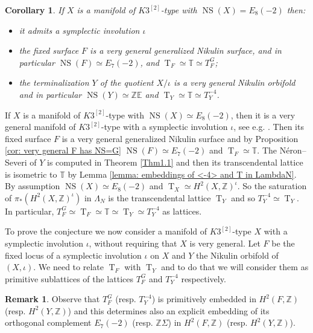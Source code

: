 \documentclass{amsart}
\newtheorem{corr}[thm]{Corollary}
\theoremstyle{definition}
\newtheorem{remark}[thm]{Remark}
\numberwithin{equation}{section}
\numberwithin{equation}{section} \theoremstyle{definition}
\DeclareMathOperator{\NS}{NS}
\DeclareMathOperator{\T}{T}
\newcommand\Z{\mathbb{Z}}
\begin{document}
\begin{corr}\label{5.4}\label{cor: very general F are G polarized and TF=TY}
If $X$ is a manifold of $K3^{[2]}$-type with $\NS(X)=E_8(-2)$ then:\begin{itemize}\item it admits a symplectic involution $\iota$ \item the fixed surface $F$ is a very general generalized Nikulin surface, and in particular $\NS(F)\simeq E_7(-2)$, and $\T_F\simeq \mathbb{T}\simeq T^G_F$; \item  the terminalization $Y$ of the quotient $X/\iota$ is a very general Nikulin orbifold and in particular $\NS(Y)\simeq \Z \mathbb{E}$ and $\T_Y\simeq \mathbb{T}\simeq T_Y^{-4}$.\end{itemize}
\end{corr}
\proof If $X$ is a  manifold of $K3^{[2]}$-type with $\NS(X)\simeq E_8(-2)$, then it is a very general  manifold of $K3^{[2]}$-type with a symplectic involution $\iota$, see e.g. \cite{CGKK}. Then its fixed surface $F$ is a very general generalized Nikulin surface and by Proposition \ref{cor: very general F has NS=G} $\NS(F)\simeq E_7(-2)$ and $\T_F\simeq \mathbb{T}$. The N\'eron--Severi of $Y$ is computed in Theorem \ref{Thm1.1} and then its transcendental lattice is isometric to $\mathbb{T}$ by Lemma \ref{lemma: embeddings of <-4> and T in LambdaN}. By assumption $\NS(X)\simeq E_8(-2)$ and $\T_X\simeq H^2(X,\Z)^{\iota}$. So the saturation of $\pi_*(H^2(X,\Z)^{\iota})$ in $\Lambda_N$ is the transcendental lattice $\T_Y$ and so $T_Y^{-4}\simeq \T_Y$.
In particular, $T_F^G\simeq \T_F\simeq \mathbb{T}\simeq \T_Y\simeq T_Y^{-4}$ as lattices. \endproof


To prove the conjecture \cite[Conjecture 3.12]{CGKK} we now consider a   manifold of $K3^{[2]}$-type $X$ with a symplectic involution $\iota$, without requiring that $X$ is very general. Let $F$ be the fixed locus of a symplectic involution $\iota$ on $X$ and $Y$ the Nikulin orbifold of $(X,\iota)$. We need to relate $\T_F$ with $\T_Y$ and to do that we will consider them as primitive sublattices of the lattices $T_F^G$ and $T_Y^{-4}$ respectively.



\begin{remark} Observe that $T_F^G$ (resp. $T_Y^{-4}$) is primitively embedded in $H^2(F,\Z)$ (resp. $H^2(Y,\Z)$) and this determines also an explicit embedding of its orthogonal complement $E_7(-2)$ (resp. $\Z \Sigma$)  in $H^2(F,\Z)$ (resp. $H^2(Y,\Z)$).\end{remark}  
\end{document}
